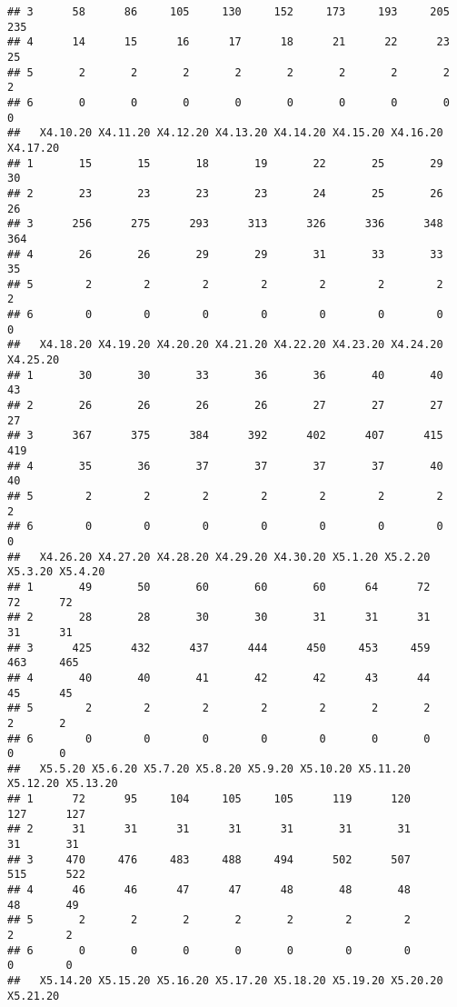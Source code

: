 \documentclass[
]{article}
\begin{document}
\begin{verbatim}
## 3      58      86     105     130     152     173     193     205     235
## 4      14      15      16      17      18      21      22      23      25
## 5       2       2       2       2       2       2       2       2       2
## 6       0       0       0       0       0       0       0       0       0
##   X4.10.20 X4.11.20 X4.12.20 X4.13.20 X4.14.20 X4.15.20 X4.16.20 X4.17.20
## 1       15       15       18       19       22       25       29       30
## 2       23       23       23       23       24       25       26       26
## 3      256      275      293      313      326      336      348      364
## 4       26       26       29       29       31       33       33       35
## 5        2        2        2        2        2        2        2        2
## 6        0        0        0        0        0        0        0        0
##   X4.18.20 X4.19.20 X4.20.20 X4.21.20 X4.22.20 X4.23.20 X4.24.20 X4.25.20
## 1       30       30       33       36       36       40       40       43
## 2       26       26       26       26       27       27       27       27
## 3      367      375      384      392      402      407      415      419
## 4       35       36       37       37       37       37       40       40
## 5        2        2        2        2        2        2        2        2
## 6        0        0        0        0        0        0        0        0
##   X4.26.20 X4.27.20 X4.28.20 X4.29.20 X4.30.20 X5.1.20 X5.2.20 X5.3.20 X5.4.20
## 1       49       50       60       60       60      64      72      72      72
## 2       28       28       30       30       31      31      31      31      31
## 3      425      432      437      444      450     453     459     463     465
## 4       40       40       41       42       42      43      44      45      45
## 5        2        2        2        2        2       2       2       2       2
## 6        0        0        0        0        0       0       0       0       0
##   X5.5.20 X5.6.20 X5.7.20 X5.8.20 X5.9.20 X5.10.20 X5.11.20 X5.12.20 X5.13.20
## 1      72      95     104     105     105      119      120      127      127
## 2      31      31      31      31      31       31       31       31       31
## 3     470     476     483     488     494      502      507      515      522
## 4      46      46      47      47      48       48       48       48       49
## 5       2       2       2       2       2        2        2        2        2
## 6       0       0       0       0       0        0        0        0        0
##   X5.14.20 X5.15.20 X5.16.20 X5.17.20 X5.18.20 X5.19.20 X5.20.20 X5.21.20

\end{verbatim}
\end{document}
